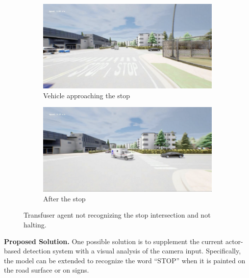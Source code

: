 \begin{figure}[htbp]
    \centering
    \begin{subfigure}[b]{0.45\textwidth}
        \centering
        \includegraphics[width=\columnwidth]{images/RS18_noStopBefore.png}
        \caption{Vehicle approaching the stop}
        \label{fig:tf_RS18_1}
    \end{subfigure}
    \hfill
    \begin{subfigure}[b]{0.45\textwidth}
        \centering
        \includegraphics[width=\columnwidth]{images/RS18_noStopafter.png}
        \caption{After the stop}
        \label{fig:tf_RS18_2}
    \end{subfigure}
    \caption{Transfuser agent not recognizing the stop intersection and not halting.}
    \label{fig:stop}
\end{figure}

\noindent\textbf{Proposed Solution.} One possible solution is to supplement the current actor-based detection system with a visual analysis of the camera input. Specifically, the model can be extended to recognize the word “STOP” when it is painted on the road surface or on signs.


